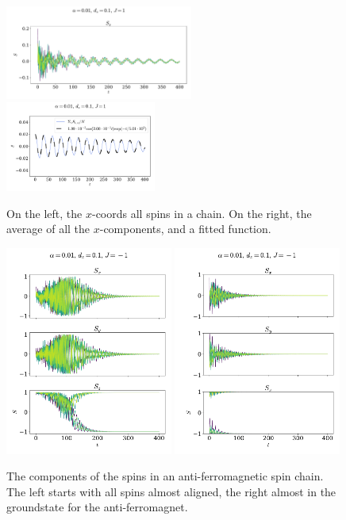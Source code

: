 \documentclass{article}
\begin{document}
    \begin{figure}[H]
        \centering
        \includegraphics[width=0.55\textwidth]{../plots/2224.pdf}
        \includegraphics[width=0.44\textwidth]{../plots/2224fit.pdf}
        \caption{On the left, the $x$-coords all spins in a chain. On the right, the average of all the $x$-components, and a fitted function.}
        \label{one tilted dampend}
    \end{figure}


    \begin{figure}[H]
        \centering
        \includegraphics[width=0.49\textwidth]{../plots/2225.pdf}
        \includegraphics[width=0.49\textwidth]{../plots/22252.pdf}
        \caption{The components of the spins in an anti-ferromagnetic spin chain. The left starts with all spins almost aligned, the right almost in the groundstate for the anti-ferromagnet.}
        \label{one tilted dampend af}
    \end{figure}
\end{document}
